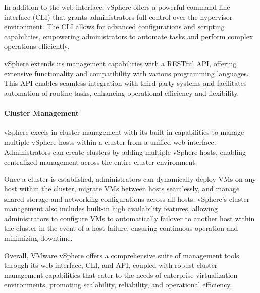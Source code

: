 In addition to the web interface, vSphere offers a powerful command-line interface (CLI) that grants administrators full control over the hypervisor environment. The CLI allows for advanced configurations and scripting capabilities, empowering administrators to automate tasks and perform complex operations efficiently.

vSphere extends its management capabilities with a RESTful API, offering extensive functionality and compatibility with various programming languages. This API enables seamless integration with third-party systems and facilitates automation of routine tasks, enhancing operational efficiency and flexibility.

\paragraph{Cluster Management} vSphere excels in cluster management with its built-in capabilities to manage multiple vSphere hosts within a cluster from a unified web interface. Administrators can create clusters by adding multiple vSphere hosts, enabling centralized management across the entire cluster environment.

Once a cluster is established, administrators can dynamically deploy VMs on any host within the cluster, migrate VMs between hosts seamlessly, and manage shared storage and networking configurations across all hosts. vSphere's cluster management also includes built-in high availability features, allowing administrators to configure VMs to automatically failover to another host within the cluster in the event of a host failure, ensuring continuous operation and minimizing downtime.

Overall, VMware vSphere offers a comprehensive suite of management tools through its web interface, CLI, and API, coupled with robust cluster management capabilities that cater to the needs of enterprise virtualization environments, promoting scalability, reliability, and operational efficiency.

